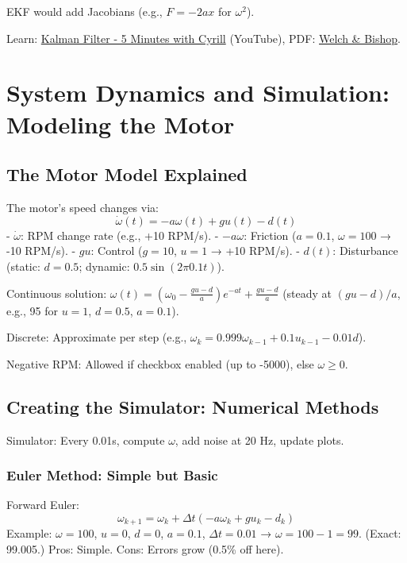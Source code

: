 \documentclass[conference]{IEEEtran}
\begin{document}
	EKF would add Jacobians (e.g., $F = -2a x$ for $\omega^2$).
	
	Learn: \href{https://www.youtube.com/watch?v=o_HW6GnLqvg}{Kalman Filter - 5 Minutes with Cyrill} (YouTube), PDF: \href{https://www.cs.unc.edu/~welch/media/pdf/kalman_intro.pdf}{Welch \& Bishop}.
	
	\section{System Dynamics and Simulation: Modeling the Motor}
	\label{sec:dynamics}
	
	\subsection{The Motor Model Explained}
	The motor's speed changes via:
	\begin{equation}
		\dot{\omega}(t) = -a \omega(t) + g u(t) - d(t)
	\end{equation}
	- $\dot{\omega}$: RPM change rate (e.g., +10 RPM/s).
	- $-a \omega$: Friction ($a=0.1$, $\omega=100$ → -10 RPM/s).
	- $g u$: Control ($g=10$, $u=1$ → +10 RPM/s).
	- $d(t)$: Disturbance (static: $d=0.5$; dynamic: $0.5 \sin(2\pi 0.1 t)$).
	
	Continuous solution: $\omega(t) = (\omega_0 - \frac{g u - d}{a}) e^{-a t} + \frac{g u - d}{a}$ (steady at $(g u - d)/a$, e.g., 95 for $u=1$, $d=0.5$, $a=0.1$).
	
	Discrete: Approximate per step (e.g., $\omega_k = 0.999 \omega_{k-1} + 0.1 u_{k-1} - 0.01 d$).
	
	Negative RPM: Allowed if checkbox enabled (up to -5000), else $\omega \geq 0$.
	
	\subsection{Creating the Simulator: Numerical Methods}
	Simulator: Every 0.01s, compute $\omega$, add noise at 20 Hz, update plots.
	
	\subsubsection{Euler Method: Simple but Basic}
	Forward Euler:
	\begin{equation}
		\omega_{k+1} = \omega_k + \Delta t \left( -a \omega_k + g u_k - d_k \right)
	\end{equation}
	Example: $\omega=100$, $u=0$, $d=0$, $a=0.1$, $\Delta t=0.01$ → $\omega=100 - 1 = 99$. (Exact: 99.005.) Pros: Simple. Cons: Errors grow (0.5\% off here).
	
\end{document}
